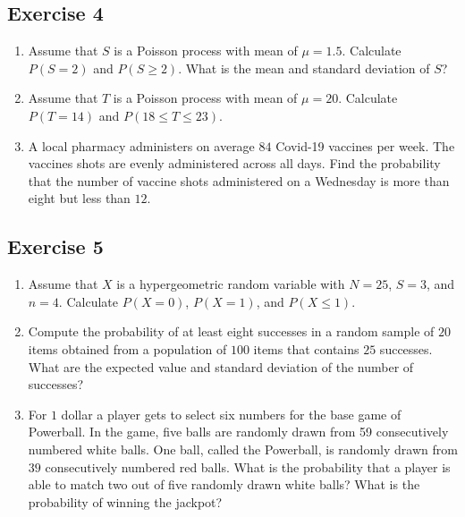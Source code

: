 \documentclass[
  letterpaper,
  DIV=11,
  numbers=noendperiod]{scrreprt}
\begin{document}
\hypertarget{exercise-4-6}{%
\subsection*{Exercise 4}\label{exercise-4-6}}

\begin{enumerate}
\def\labelenumi{\arabic{enumi}.}
\item
  Assume that \(S\) is a Poisson process with mean of \(\mu=1.5\).
  Calculate \(P(S=2)\) and \(P(S \geq 2)\). What is the mean and
  standard deviation of \(S\)?
\item
  Assume that \(T\) is a Poisson process with mean of \(\mu=20\).
  Calculate \(P(T=14)\) and \(P(18 \leq T \leq 23)\).
\item
  A local pharmacy administers on average \(84\) Covid-19 vaccines per
  week. The vaccines shots are evenly administered across all days. Find
  the probability that the number of vaccine shots administered on a
  Wednesday is more than eight but less than \(12\).
\end{enumerate}

\hypertarget{exercise-5-2}{%
\subsection*{Exercise 5}\label{exercise-5-2}}

\begin{enumerate}
\def\labelenumi{\arabic{enumi}.}
\item
  Assume that \(X\) is a hypergeometric random variable with \(N=25\),
  \(S=3\), and \(n=4\). Calculate \(P(X=0)\), \(P(X=1)\), and
  \(P(X \leq 1)\).
\item
  Compute the probability of at least eight successes in a random sample
  of \(20\) items obtained from a population of \(100\) items that
  contains \(25\) successes. What are the expected value and standard
  deviation of the number of successes?
\item
  For \(1\) dollar a player gets to select six numbers for the base game
  of Powerball. In the game, five balls are randomly drawn from 59
  consecutively numbered white balls. One ball, called the Powerball, is
  randomly drawn from \(39\) consecutively numbered red balls. What is
  the probability that a player is able to match two out of five
  randomly drawn white balls? What is the probability of winning the
  jackpot?
\end{enumerate}
\end{document}
